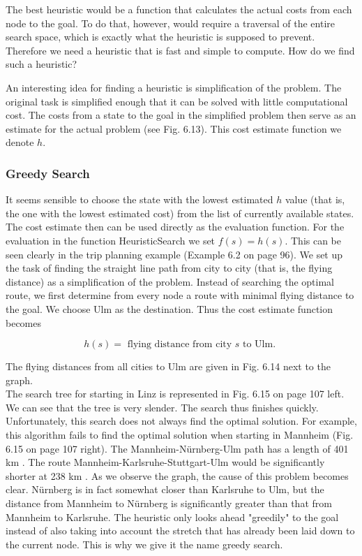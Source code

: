 \documentclass[10pt]{book}
\begin{document}
The best heuristic would be a function that calculates the actual costs from each node to the goal. To do that, however, would require a traversal of the entire search space, which is exactly what the heuristic is supposed to prevent. Therefore we need a heuristic that is fast and simple to compute. How do we find such a heuristic?

An interesting idea for finding a heuristic is simplification of the problem. The original task is simplified enough that it can be solved with little computational cost. The costs from a state to the goal in the simplified problem then serve as an estimate for the actual problem (see Fig. 6.13). This cost estimate function we denote $h$.

\subsubsection*{Greedy Search}
It seems sensible to choose the state with the lowest estimated $h$ value (that is, the one with the lowest estimated cost) from the list of currently available states. The cost estimate then can be used directly as the evaluation function. For the evaluation in the function HeuristicSearch we set $f(s)=h(s)$. This can be seen clearly in the trip planning example (Example 6.2 on page 96). We set up the task of finding the straight line path from city to city (that is, the flying distance) as a simplification of the problem. Instead of searching the optimal route, we first determine from every node a route with minimal flying distance to the goal. We choose Ulm as the destination. Thus the cost estimate function becomes

$$
h(s)=\text { flying distance from city } s \text { to Ulm. }
$$

The flying distances from all cities to Ulm are given in Fig. 6.14 next to the graph.\\
The search tree for starting in Linz is represented in Fig. 6.15 on page 107 left. We can see that the tree is very slender. The search thus finishes quickly. Unfortunately, this search does not always find the optimal solution. For example, this algorithm fails to find the optimal solution when starting in Mannheim (Fig. 6.15 on page 107 right). The Mannheim-Nürnberg-Ulm path has a length of 401 km . The route Mannheim-Karlsruhe-Stuttgart-Ulm would be significantly shorter at 238 km . As we observe the graph, the cause of this problem becomes clear. Nürnberg is in fact somewhat closer than Karlsruhe to Ulm, but the distance from Mannheim to Nürnberg is significantly greater than that from Mannheim to Karlsruhe. The heuristic only looks ahead "greedily" to the goal instead of also taking into account the stretch that has already been laid down to the current node. This is why we give it the name greedy search.
\end{document}
